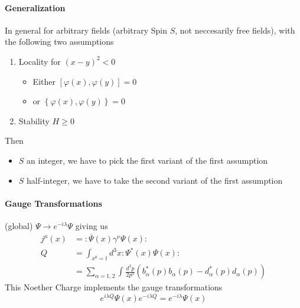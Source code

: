 \documentclass{report}
\begin{document}
\paragraph{Generalization} In general for arbitrary fields (arbitrary Spin $S$, not neccesarily free fields), with the following two assumptions
\begin{enumerate}
  \item Locality for $\left( x-y \right) ^2 < 0$ 
    \begin{itemize}
      \item Either $\left[ \varphi\left( x \right) , \varphi\left( y \right)  \right] = 0$ 
      \item or $\left\{ \varphi\left( x \right) , \varphi\left( y \right)  \right\} = 0$
    \end{itemize}
  \item Stability $H \ge 0$
\end{enumerate}
Then
\begin{itemize}
  \item $S$ an integer, we have to pick the first variant of the first assumption
  \item $S$ half-integer, we have to take the second variant of the first assumption
\end{itemize}
\paragraph{Gauge Transformations} (global) $\Psi \to  e^{-i\lambda} \Psi$ giving us
\begin{align*}
  j^{\mu} \left( x \right) &= :\overline{\Psi}\left( x \right) \gamma^{\nu} \Psi\left( x \right) : \\
  Q &=  \int_{x^{0} = t}^{} d^3x : \Psi^{*} \left( x \right) \Psi\left( x \right) :  \\
  &= \sum_{\alpha = 1,2}^{} \int_{}^{} \frac{d^3p}{2p^{0} } \left( b_\alpha ^{*} \left( p \right) b_\alpha \left( p \right) - d_\alpha ^{*} \left( p \right) d_\alpha \left( p \right)  \right)  
\end{align*}
This Noether Charge implements the gauge transformations \[
e^{i\lambda Q} \Psi\left( x \right) e^{-i\lambda Q} = e^{-i\lambda} \Psi\left( x \right) 
\] 
\end{document}
